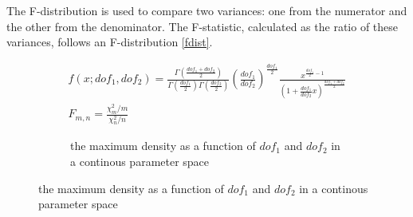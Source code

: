 \documentclass[
  a4paper,
]{scrbook}
\begin{document}
The F-distribution is used to compare two variances: one from the
numerator and the other from the denominator. The F-statistic,
calculated as the ratio of these variances, follows an F-distribution
\eqref{fdist}.

\begin{align}
f(x; dof_1, dof_2) = \frac{{\Gamma\left(\frac{{dof_1 + dof_2}}{2}\right)}}{{\Gamma\left(\frac{{dof_1}}{2}\right)\Gamma\left(\frac{{dof_2}}{2}\right)}} \left(\frac{{dof_1}}{{dof_2}}\right)^{\frac{{dof_1}}{2}} \frac{{x^{\frac{{dof_1}}{2} - 1}}}{{\left(1 + \frac{{dof_1}}{{dof_2}}x\right)^{\frac{{dof_1 + dof_2}}{2}}}} \label{fdist} \\
F_{m,n} = \frac{\chi^2_m/m}{\chi^2_n/n} 
\end{align}

\begin{figure}

\begin{minipage}{\linewidth}

\begin{figure}[H]


\caption{\label{fig-f-dist-02}the maximum density as a function of
\(dof_1\) and \(dof_2\) in a continous parameter space}

\end{figure}%

\end{minipage}%

\end{figure}%
\end{document}
